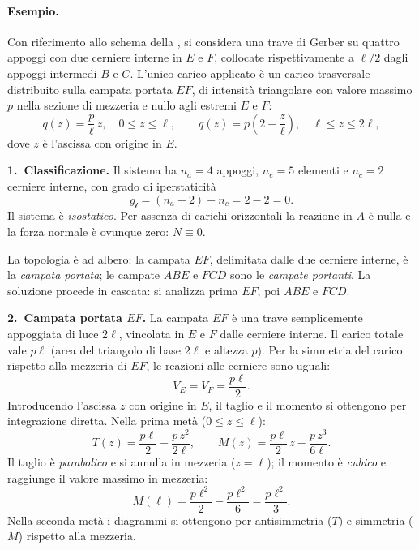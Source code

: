 \paragraph{Esempio.}
\label{par:esempio_gerber}

Con riferimento allo schema della ,
si considera una trave di Gerber su quattro appoggi con due cerniere
interne in $E$ e $F$, collocate rispettivamente a $\ell/2$ dagli
appoggi intermedi $B$ e $C$.  L'unico carico applicato è un
carico trasversale distribuito sulla campata portata $EF$, di
intensità triangolare con valore massimo $p$ nella sezione di
mezzeria e nullo agli estremi $E$ e $F$:
\[
q(z) = \frac{p}{\ell}\,z, \quad 0 \le z \le \ell,
\qquad
q(z) = p\!\left(2 - \frac{z}{\ell}\right), \quad \ell \le z \le 2\ell,
\]
dove $z$ è l'ascissa con origine in $E$.





\medskip
\noindent\textbf{1.~Classificazione.}
Il sistema ha $n_a = 4$ appoggi, $n_e = 5$ elementi e $n_c = 2$
cerniere interne, con grado di iperstaticità
\[
g_{\mathscr{i}} = (n_a - 2) - n_c = 2 - 2 = 0.
\]
Il sistema è \emph{isostatico}. Per assenza di carichi orizzontali
la reazione in $A$ è nulla e la forza normale è ovunque zero:
$N \equiv 0$.

La topologia è ad albero: la campata $EF$, delimitata dalle due
cerniere interne, è la \emph{campata portata}; le campate $ABE$
e $FCD$ sono le \emph{campate portanti}. La soluzione procede in
cascata: si analizza prima $EF$, poi $ABE$ e $FCD$.

\medskip
\noindent\textbf{2.~Campata portata $EF$.}
La campata $EF$ è una trave semplicemente appoggiata di luce $2\ell$,
vincolata in $E$ e $F$ dalle cerniere interne. Il carico totale vale
$p\ell$ (area del triangolo di base $2\ell$ e altezza $p$).
Per la simmetria del carico rispetto alla mezzeria di $EF$, le
reazioni alle cerniere sono uguali:
\[
V_E = V_F = \frac{p\ell}{2}.
\]
Introducendo l'ascissa $z$ con origine in $E$, il taglio e il
momento si ottengono per integrazione diretta. Nella prima metà
($0 \le z \le \ell$):
\[
T(z) = \frac{p\ell}{2} - \frac{p\,z^2}{2\ell},
\qquad
M(z) = \frac{p\ell}{2}\,z - \frac{p\,z^3}{6\ell}.
\]
Il taglio è \emph{parabolico} e si annulla in mezzeria ($z = \ell$);
il momento è \emph{cubico} e raggiunge il valore massimo in mezzeria:
\[
M\!\left(\ell\right) = \frac{p\ell^2}{2} - \frac{p\ell^2}{6}
= \frac{p\ell^2}{3}.
\]
Nella seconda metà i diagrammi si ottengono per antisimmetria ($T$)
e simmetria ($M$) rispetto alla mezzeria.

